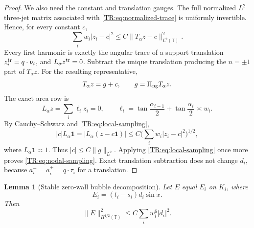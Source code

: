 \documentclass[11pt]{amsart}
\numberwithin{equation}{section}
\newtheorem{lemma}[theorem]{Lemma}
\theoremstyle{definition}
\theoremstyle{remark}
\newcommand{\T}{\mathbb T}
\newcommand{\PiNG}{\Pi_{\rm ng}}
\begin{document}
\begin{proof}
We also need the constant and translation gauges.  The full normalized
$L^2$ three-jet matrix associated with \eqref{TR:eq:normalized-trace} is
uniformly invertible.  Hence, for every constant $c$,
\begin{equation}\label{TR:eq:local-sampling}
 \sum_iw_i|z_i-c|^2
 \le C\|T_\alpha z-c\|_{L^2(\T)}^2.
\end{equation}
Every first harmonic is exactly the angular trace of a support
translation $z_i^{\rm tr}=q\cdot\nu_i$, and $L_\alpha z^{\rm tr}=0$.
Subtract the unique translation producing the $n=\pm1$ part of
$T_\alpha z$.  For the resulting representative,
\begin{equation*}
 T_\alpha z=g+c,\qquad g=\PiNG T_\alpha z.
\end{equation*}
The exact area row is
\begin{equation}\label{TR:eq:exact-area-row}
 L_\alpha z=\sum_i\ell_i z_i=0,\qquad
 \ell_i=\tan\frac{\alpha_{i-1}}2+
        \tan\frac{\alpha_i}2\asymp w_i.
\end{equation}
By Cauchy--Schwarz and \eqref{TR:eq:local-sampling},
\begin{equation*}
 |c|L_\alpha\mathbf1=|L_\alpha(z-c\mathbf1)|
 \le C\Big(\sum_iw_i|z_i-c|^2\Big)^{1/2},
\end{equation*}
where $L_\alpha\mathbf1\asymp1$.  Thus
$|c|\le C\|g\|_{L^2}$.  Applying
\eqref{TR:eq:local-sampling} once more proves
\eqref{TR:eq:nodal-sampling}.  Exact translation subtraction does not
change $d_i$, because $a_i^-=a_i^+=q\cdot\tau_i$ for a translation.
\end{proof}

\begin{lemma}[Stable zero-wall bubble decomposition]
\label{TR:lem:zero-wall}
Let $E$ equal $E_i$ on $K_i$, where
\begin{equation}\label{TR:eq:trace-error-local}
 E_i=(t_i-s_i)d_i\sin x.
\end{equation}
Then
\begin{equation}\label{TR:eq:zero-wall-bound}
 \|E\|_{H^{1/2}(\T)}^2\le C\sum_iw_i^6|d_i|^2.
\end{equation}
\end{lemma}
\end{document}
